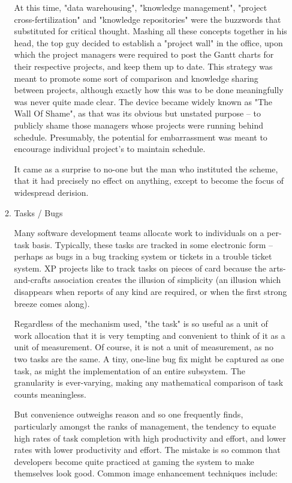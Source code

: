 \documentclass{article}
\begin{document}
\begin{enumerate}
\begin{enumerate}
At this time, "data warehousing", "knowledge management", "project
cross-fertilization" and "knowledge repositories" were the buzzwords
that substituted for critical thought. Mashing all these concepts
together in his head, the top guy decided to establish a "project wall"
in the office, upon which the project managers were required to post the
Gantt charts for their respective projects, and keep them up to date.
This strategy was meant to promote some sort of comparison and knowledge
sharing between projects, although exactly how this was to be done
meaningfully was never quite made clear. The device became widely known
as "The Wall Of Shame", as that was its obvious but unstated purpose --
to publicly shame those managers whose projects were running behind
schedule. Presumably, the potential for embarrassment was meant to
encourage individual project's to maintain schedule.

It came as a surprise to no-one but the man who instituted the scheme,
that it had precisely no effect on anything, except to become the focus
of widespread derision.

\item Tasks / Bugs
\label{sec:orgheadline171}

Many software development teams allocate work to individuals on a
per-task basis. Typically, these tasks are tracked in some electronic
form -- perhaps as bugs in a bug tracking system or tickets in a trouble
ticket system. XP projects like to track tasks on pieces of card because
the arts-and-crafts association creates the illusion of simplicity (an
illusion which disappears when reports of any kind are required, or when
the first strong breeze comes along).

Regardless of the mechanism used, "the task" is so useful as a unit of
work allocation that it is very tempting and convenient to think of it
as a unit of measurement. Of course, it is not a unit of measurement, as
no two tasks are the same. A tiny, one-line bug fix might be captured as
one task, as might the implementation of an entire subsystem. The
granularity is ever-varying, making any mathematical comparison of task
counts meaningless.

But convenience outweighs reason and so one frequently finds,
particularly amongst the ranks of management, the tendency to equate
high rates of task completion with high productivity and effort, and
lower rates with lower productivity and effort. The mistake is so common
that developers become quite practiced at gaming the system to make
themselves look good. Common image enhancement techniques include:


\end{enumerate}
\end{enumerate}
\end{document}
